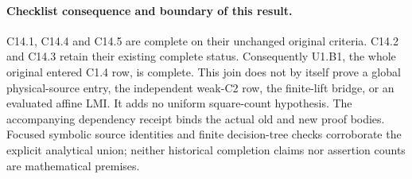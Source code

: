 \paragraph{Checklist consequence and boundary of this result.}
C14.1, C14.4 and C14.5 are complete on their unchanged original
criteria.  C14.2 and C14.3 retain their existing complete status.
Consequently U1.B1, the whole original entered C1.4 row, is complete.
This join does not by itself prove a global physical-source entry,
the independent weak-C2 row, the finite-lift bridge, or an evaluated
affine LMI.  It adds no uniform square-count hypothesis.
The accompanying dependency receipt binds the actual old and new
proof bodies.  Focused symbolic source identities and finite
decision-tree checks corroborate the explicit analytical union;
neither historical completion claims nor assertion counts are
mathematical premises.
